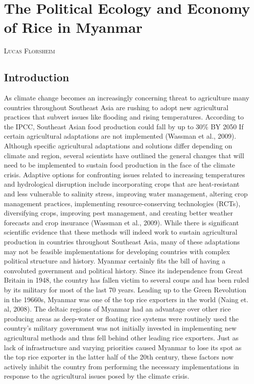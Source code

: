 \documentclass{book}\usepackage{knitr}
\makeatletter
\newcommand{\chapterauthor}[1]{%
  {\parindent0pt\vspace*{-25pt}%
  \linespread{1.1}\large\scshape#1%
  \par\nobreak\vspace*{35pt}}
  \@afterheading%
}
\makeatother
\begin{document}
\chapter{The Political Ecology and Economy of Rice in Myanmar}

\chapterauthor{Lucas Florsheim}

\section{Introduction}

As climate change becomes an increasingly concerning threat to agriculture many countries throughout Southeast Asia are rushing to adopt new agricultural practices that subvert issues like flooding and rising temperatures. According to the IPCC, Southeast Asian food production could fall by up to 30\% BY 2050 If certain agricultural adaptations are not implemented (Wassman et al., 2009). Although specific agricultural adaptations and solutions differ depending on climate and region, several scientists have outlined the general changes that will need to be implemented to sustain food production in the face of the climate crisis. 
Adaptive options for confronting issues related to increasing temperatures and hydrological disruption include incorporating crops that are heat-resistant and less vulnerable to salinity stress, improving water management, altering crop management practices, implementing resource-conserving technologies (RCTs), diversifying crops, improving pest management, and creating better weather forecasts and crop insurance (Wassman et al., 2009). While there is significant scientific evidence that these methods will indeed work to sustain agricultural production in countries throughout Southeast Asia, many of these adaptations may not be feasible implementations for developing countries with complex political structure and history. 
Myanmar certainly fits the bill of having a convoluted government and political history. Since its independence from Great Britain in 1948, the country has fallen victim to several coups and has been ruled by its military for most of the last 70 years. Leading up to the Green Revolution in the 19660s, Myanmar was one of the top rice exporters in the world (Naing et. al, 2008). The deltaic regions of Myanmar had an advantage over other rice producing areas as deep-water or floating rice systems were routinely used the country’s military government was not initially invested in implementing new agricultural methods and thus fell behind other leading rice exporters. Just as lack of infrastructure and varying priorities caused Myanmar to lose its spot as the top rice exporter in the latter half of the 20th century, these factors now actively inhibit the country from performing the necessary implementations in response to the agricultural issues posed by the climate crisis. 
\end{document}
